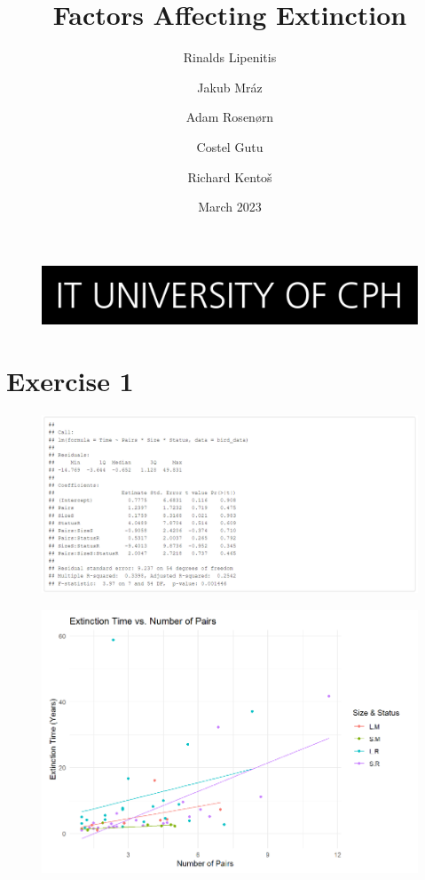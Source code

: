 \documentclass{article}
\begin{document}
\title{Factors Affecting Extinction}
\begin{figure}
    \includegraphics[width=\linewidth]{ITU.jpg}
\end{figure}
\maketitle
\author{Rinalds Lipenitis \and Jakub Mráz \and
Adam Rosenørn \and Costel Gutu \and Richard Kentoš}
\date{March 2023}

\newpage

\section{Exercise 1}

\begin{figure}
    \includegraphics[width=\linewidth]{tables/all-multiplied.png}
\end{figure}

\begin{figure}
    \includegraphics[width=\linewidth]{graphs/graph1.png}
\end{figure}
\end{document}
